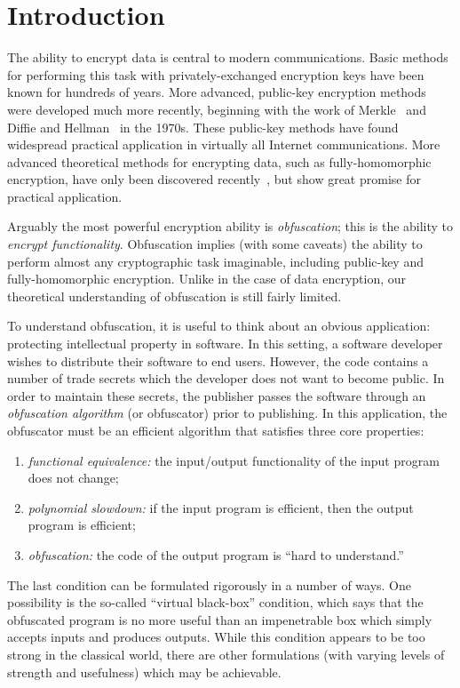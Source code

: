 \documentclass[11pt]{article}
\numberwithin{equation}{section}
\begin{document}
{\newpage
\tableofcontents
\newpage


\section{Introduction}\label{sec:intro}

The ability to encrypt data is central to modern communications. Basic methods for performing this task with privately-exchanged encryption keys have been known for hundreds of years. More advanced, public-key encryption methods were developed much more recently, beginning with the work of Merkle~\cite{Merkle78} and Diffie and Hellman~\cite{DH76} in the 1970s. These public-key methods have found widespread practical application in virtually all Internet communications. More advanced theoretical methods for encrypting data, such as fully-homomorphic encryption, have only been discovered recently~\cite{Gentry09}, but show great promise for practical application.

Arguably the most powerful encryption ability is \emph{obfuscation}; this is the ability to \emph{encrypt functionality}. Obfuscation implies (with some caveats) the ability to perform almost any cryptographic task imaginable, including public-key and fully-homomorphic encryption. Unlike in the case of data encryption, our theoretical understanding of obfuscation is still fairly limited. 

To understand obfuscation, it is useful to think about an obvious application: protecting intellectual property in software. In this setting, a software developer wishes to distribute their software to end users. However, the code contains a number of trade secrets which the developer does not want to become public. In order to maintain these secrets, the publisher passes the software through an \emph{obfuscation algorithm} (or obfuscator) prior to publishing. In this application, the obfuscator must be an efficient algorithm that satisfies three core properties: 
\begin{enumerate}\label{def:obf-informal}
\item \emph{functional equivalence:} the input/output functionality of the input program does not change;
\item \emph{polynomial slowdown:} if the input program is efficient, then the output program is efficient;
\item \emph{obfuscation:} the code of the output program is ``hard to understand.''
\end{enumerate}
The last condition can be formulated rigorously in a number of ways. One possibility is the so-called ``virtual black-box'' condition, which says that the obfuscated program is no more useful than an impenetrable box which simply accepts inputs and produces outputs. While this condition appears to be too strong in the classical world, there are other formulations (with varying levels of strength and usefulness) which may be achievable.

}
\end{document}
